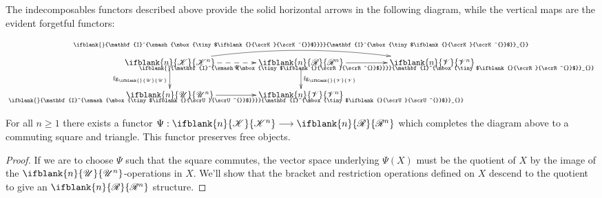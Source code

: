 \documentclass[10pt]{article}
\newcommand{\GS}[1]{\scrE^{#1}}
\newcommand{\PRLie}[1]%
{\ifblank{#1}{\scrR}{\scrR^{#1}}}
\newcommand{\LL}[1]{\ifblank{#1}{\scrK}{\scrK^{#1}}}
\newcommand{\GR}[1]{\ifblank{#1}{\scrV}{\scrV^{#1}}}
\newcommand{\nontop}[1]{\ifblank{#1}{\scrU}{\scrU^{#1}}}
\newcommand{\Ind}[2][]{\ifblank{#1}{\mathbf{I}^{\smash{\mbox{\tiny $#2$}}}}{\mathbf{I}^{\mbox{\tiny $#2$}}_{#1}}}%
\newcommand{\forgetSymbol}{\mathrm{fg}}
\newcommand{\forget}[1]{\mathrm{fg}_{\smash{\mbox{\tiny $#1$}}}}
\begin{document}
\begin{DiagramOfFunctors}

The indecomposables functors described above provide the solid horizontal arrows in the following diagram, while the vertical maps are the evident forgetful functors:

\[\xymatrix@R=8mm@C=15mm@!C{
\LL{n}
\ar@/^1.5em/[rr]^-{\Ind{\LL{}}}
\ar[d]_-{\forget{\nontop{}}}
\ar@{-->}[r]_-{\Psi}%
&%
\PRLie{n}
\ar[d]^-{\forget{\GR{}}}
\ar[r]_-{\Ind{\PRLie{}}}
&%
\GR{n}
\\%
\nontop{n}
\ar[r]_-{\Ind{\nontop{}}}
&%
\GR{n}
&%
}\]
\begin{prop}\label{PropOnTheCommutingDiagramOfIndFunctors}
For all $n\geq1$ there exists a functor $\Psi:\LL{n}\to\PRLie{n}$ which completes the diagram above to a commuting square and triangle. This functor %
preserves free objects.
\end{prop}
\begin{proof}
If we are to choose $\Psi$ such that the square commutes, the vector space underlying $\Psi(X)$ must be the quotient of $X$ by the image of the $\nontop{n}$-operations in $X$. We'll show that the bracket and restriction operations defined on $X$ descend to the quotient to give an $\PRLie{n}$ structure. %


\end{proof}
\end{DiagramOfFunctors}
\end{document}

